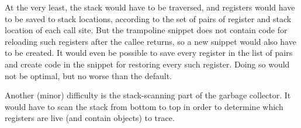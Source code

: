 At the very least, the stack would have to be traversed, and registers
would have to be saved to stack locations, according to the set of
pairs of register and stack location of each call site.  But the
trampoline snippet does not contain code for reloading such registers
after the callee returns, so a new snippet would also have to be
created.  It would even be possible to save every register in the list
of pairs and create code in the snippet for restoring every such
register.  Doing so would not be optimal, but no worse than the
default.

Another (minor) difficulty is the stack-scanning part of the garbage
collector.  It would have to scan the stack from bottom to top in
order to determine which registers are live (and contain \commonlisp{}
objects) to trace.

